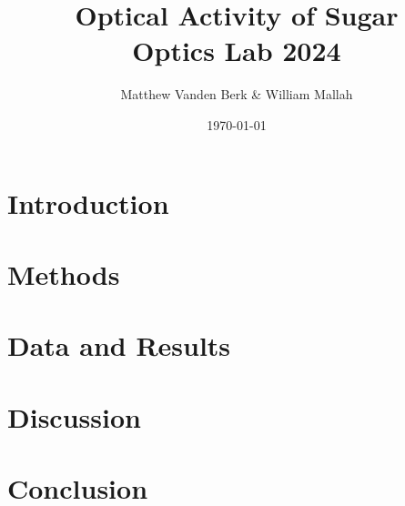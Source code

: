 \documentclass[12pt, letterpaper]{article}
\title{Optical Activity of Sugar \\
    \large Optics Lab 2024}
\author{Matthew Vanden Berk \& William Mallah}
\affil{Department of Physics, Saint Vincent College}
\date{\today}
\begin{document}
    \maketitle

    \begin{abstract}
        
    \end{abstract}
\newpage

    \section{Introduction}
    

	\newpage
    \section{Methods}
    

	\newpage
    \section{Data and Results}
    

	\newpage
    \section{Discussion}
    
    
   	\newpage
    \section{Conclusion}
    

    \newpage
    
\end{document}
